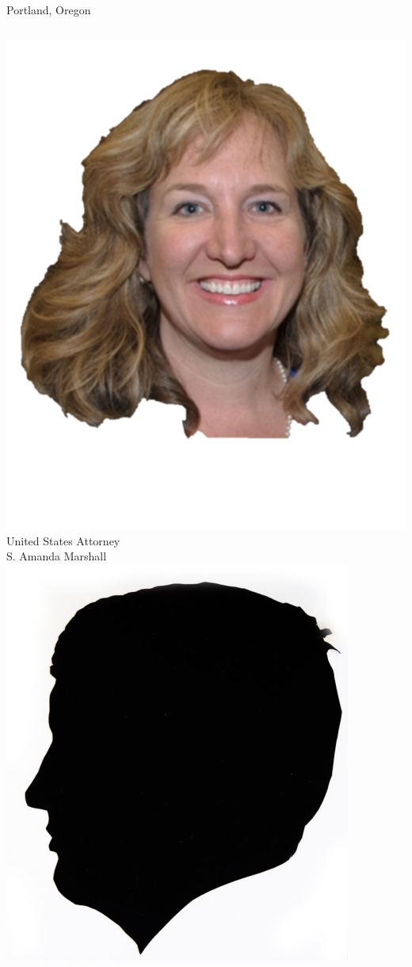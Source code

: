 \documentclass{beamer}
\begin{document}
\begin{frame}{Portland, Oregon}
    \begin{columns}[onlytextwidth]
            \centering
            \includegraphics[height=0.28\textheight]{img/amanda-marshall.png}
            \\ United States Attorney \\ S. Amanda Marshall \\
            \includegraphics[height=0.28\textheight]{img/elmer-dickens.png}

\end{columns}
\end{frame}
\end{document}
